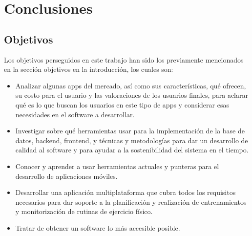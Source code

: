 \chapter{Conclusiones}

\section{Objetivos}

Los objetivos perseguidos en este trabajo han sido los previamente mencionados en la sección objetivos en la introducción, los cuales son:
\begin{itemize}
	\item Analizar algunas apps del mercado, así como sus características, qué ofrecen, su costo para el usuario y las valoraciones de los usuarios finales, para aclarar qué es lo que buscan los usuarios en este tipo de apps y considerar esas necesidades en el software a desarrollar.
	\item Investigar sobre qué herramientas usar para la implementación de la base de datos, backend, frontend, y técnicas y metodologías para dar un desarrollo de calidad al software y para ayudar a la sostenibilidad del sistema en el tiempo.
	\item Conocer y aprender a usar herramientas actuales y punteras para el desarrollo de aplicaciones móviles. 
	\item Desarrollar una aplicación multiplataforma que cubra todos los requisitos necesarios para dar soporte a la planificación y realización de entrenamientos y monitorización de rutinas de ejercicio físico. 
	\item Tratar de obtener un software lo más accesible posible.
\end{itemize}

